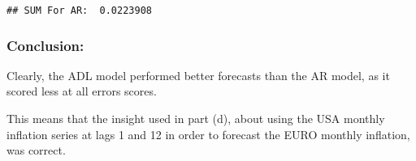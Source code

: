 \documentclass[]{article}
\begin{document}
\begin{verbatim}
## SUM For AR:  0.0223908
\end{verbatim}

\hypertarget{conclusion}{%
\subsubsection{Conclusion:}\label{conclusion}}

Clearly, the ADL model performed better forecasts than the AR model, as
it scored less at all errors scores.

This means that the insight used in part (d), about using the USA
monthly inflation series at lags 1 and 12 in order to forecast the EURO
monthly inflation, was correct.
\end{document}
